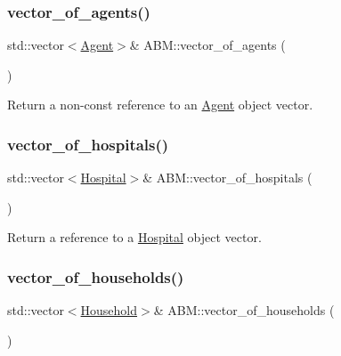 \subsubsection{\texorpdfstring{vector\+\_\+of\+\_\+agents()}{vector\_of\_agents()}}
{\footnotesize\ttfamily std\+::vector$<$\hyperlink{classAgent}{Agent}$>$\& A\+B\+M\+::vector\+\_\+of\+\_\+agents (\begin{DoxyParamCaption}{ }\end{DoxyParamCaption})\hspace{0.3cm}{\ttfamily [inline]}}



Return a non-\/const reference to an \hyperlink{classAgent}{Agent} object vector. 

\mbox{\label{classABM_ad51360c08ebbbc18a574078901f6c82a}} 
\subsubsection{\texorpdfstring{vector\+\_\+of\+\_\+hospitals()}{vector\_of\_hospitals()}}
{\footnotesize\ttfamily std\+::vector$<$\hyperlink{classHospital}{Hospital}$>$\& A\+B\+M\+::vector\+\_\+of\+\_\+hospitals (\begin{DoxyParamCaption}{ }\end{DoxyParamCaption})\hspace{0.3cm}{\ttfamily [inline]}}



Return a reference to a \hyperlink{classHospital}{Hospital} object vector. 

\mbox{\label{classABM_ab8340f988fa5a0bbfad783b04b2f86cf}} 
\subsubsection{\texorpdfstring{vector\+\_\+of\+\_\+households()}{vector\_of\_households()}}
{\footnotesize\ttfamily std\+::vector$<$\hyperlink{classHousehold}{Household}$>$\& A\+B\+M\+::vector\+\_\+of\+\_\+households (\begin{DoxyParamCaption}{ }\end{DoxyParamCaption})\hspace{0.3cm}{\ttfamily [inline]}}



